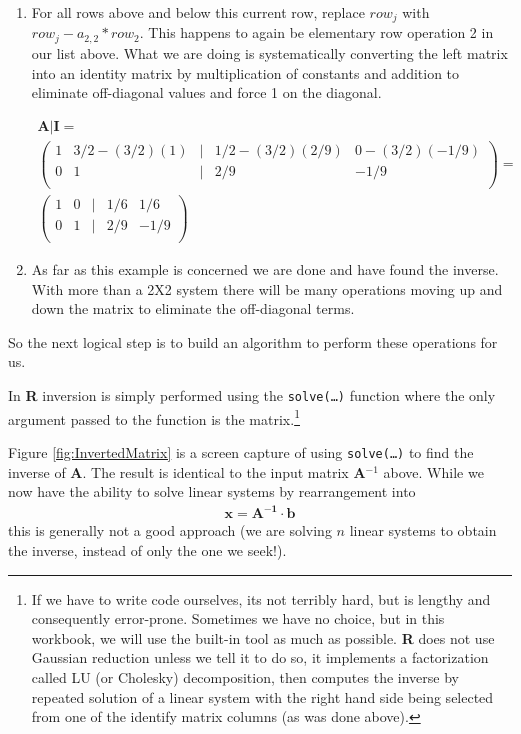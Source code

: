 \begin{enumerate}
\item For all rows above and below this current row, replace $row_j$ with $row_j - a_{2,2}*row_2$.  
This happens to again be elementary row operation 2 in our list above.  
What we are doing is systematically converting the left matrix into an identity matrix by multiplication of constants and addition to eliminate off-diagonal values and force 1 on the diagonal.

\begin{gather}
\mathbf{A} | \mathbf{I} = \\
\begin{pmatrix}
1 & 3/2 - (3/2)(1) & | & 1/2 - (3/2)(2/9) & 0-(3/2)(-1/9) \\
0 & 1 & | & 2/9 & -1/9 \\
\end{pmatrix}
= \\
\begin{pmatrix}
1 & 0 & | & 1/6 & 1/6 \\
0 & 1 & | & 2/9 & -1/9 \\
\end{pmatrix}
\end{gather}

\item As far as this example is concerned we are done and have found the inverse.  
With more than a 2X2 system there will be many operations moving up and down the matrix to eliminate the off-diagonal terms.
\end{enumerate}
So the next logical step is to build an algorithm to perform these operations for us.  

In \textbf{R} inversion is simply performed using the \texttt{solve(\dots)} function where the only argument passed to the function is the matrix.\footnote{If we have to write code ourselves, its not terribly hard, but is lengthy and consequently error-prone. Sometimes we have no choice, but in this workbook, we will use the built-in tool as much as possible.  \textbf{R} does not use Gaussian reduction unless we tell it to do so, it implements a factorization called LU (or Cholesky) decomposition, then computes the inverse by repeated solution of a linear system with the right hand side being selected from one of the identify matrix columns (as was done above).}

Figure \ref{fig:InvertedMatrix} is a screen capture of using \texttt{solve(\dots)} to find the inverse of \textbf{A}.  The result is identical to the input matrix \textbf{A$^{-1}$} above.   
While we now have the ability to solve linear systems by rearrangement into 
\begin{gather}
\mathbf{x} = \mathbf{A^{-1}} \cdot \mathbf{b}
\end{gather}
this is generally not a good approach (we are solving $n$ linear systems to obtain the inverse, instead of only the one we seek!).

